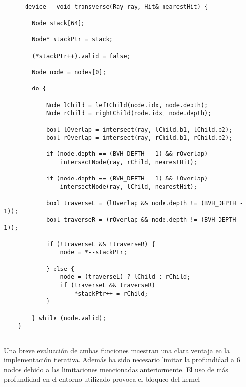 \begin{minipage}[c]{0.95\textwidth}
\begin{lstlisting}[label={cod:bvhtransversalit}, caption={Recorrido del árbol BVH iterativo}]
		
	__device__ void transverse(Ray ray, Hit& nearestHit) {

		Node stack[64];

		Node* stackPtr = stack;

		(*stackPtr++).valid = false;

		Node node = nodes[0];

		do {

			Node lChild = leftChild(node.idx, node.depth);
			Node rChild = rightChild(node.idx, node.depth);

			bool lOverlap = intersect(ray, lChild.b1, lChild.b2);
			bool rOverlap = intersect(ray, rChild.b1, rChild.b2);

			if (node.depth == (BVH_DEPTH - 1) && rOverlap)
				intersectNode(ray, rChild, nearestHit);

			if (node.depth == (BVH_DEPTH - 1) && lOverlap)
				intersectNode(ray, lChild, nearestHit);
			
			bool traverseL = (lOverlap && node.depth != (BVH_DEPTH - 1));
			bool traverseR = (rOverlap && node.depth != (BVH_DEPTH - 1));

			if (!traverseL && !traverseR) {
				node = *--stackPtr;

			} else {
				node = (traverseL) ? lChild : rChild;
				if (traverseL && traverseR)
					*stackPtr++ = rChild;
			}

		} while (node.valid);
	}
	
\end{lstlisting}
\end{minipage}

Una breve evaluación de ambas funciones muestran una clara ventaja en la implementación iterativa. Además ha sido necesario limitar la profundidad a 6 nodos debido a las limitaciones mencionadas anteriormente. El uso de más profundidad en el entorno utilizado provoca el bloqueo del kernel



